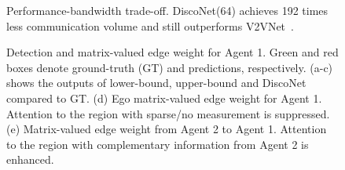 \documentclass{article}
\begin{document}
\begin{figure}[t]
\centering
{}\centering
	\vspace{-2mm}
\caption{Performance-bandwidth trade-off. DiscoNet(64) achieves 192 times less communication volume and still outperforms V2VNet~\cite{wang2020v2vnet}.}
\label{fig:trade-off and compression}
	\vspace{-6mm}
\end{figure}

\begin{figure}[t]
\centering
{}\centering
\caption{Detection and matrix-valued edge weight for Agent 1. Green and red boxes  denote ground-truth (GT) and predictions, respectively. (a-c) shows the outputs of lower-bound, upper-bound and  DiscoNet compared to GT. (d) Ego matrix-valued edge weight for Agent 1. Attention to the region with sparse/no measurement is suppressed. (e) Matrix-valued edge weight from Agent 2 to Agent 1.  Attention to the region with complementary information from Agent 2  is enhanced.}
\label{fig:edge}
	\vspace{-2mm}
\end{figure}
\end{document}
